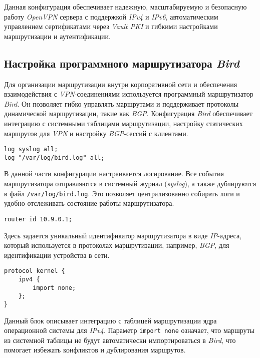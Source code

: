 Данная конфигурация обеспечивает надежную, масштабируемую и безопасную работу \textit{OpenVPN} сервера с поддержкой \textit{IPv4} и \textit{IPv6}, автоматическим управлением сертификатами через \textit{Vault PKI} и гибкими настройками маршрутизации и аутентификации.

\subsection[ Настройка программного маршрутизатора \textit{Bird}]{Настройка программного маршрутизатора \textit{Bird}}

Для организации маршрутизации внутри корпоративной сети и обеспечения взаимодействия с \textit{VPN}-соединениями используется программный маршрутизатор \textit{Bird}. Он позволяет гибко управлять маршрутами и поддерживает протоколы динамической маршрутизации, такие как \textit{BGP}. Конфигурация \textit{Bird} обеспечивает интеграцию с системными таблицами маршрутизации, настройку статических маршрутов для \textit{VPN} и настройку \textit{BGP}-сессий с клиентами.

\begin{lstlisting}
log syslog all;
log "/var/log/bird.log" all;
\end{lstlisting}

В данной части конфигурации настраивается логирование. Все события маршрутизатора отправляются в системный журнал (\textit{syslog}), а также дублируются в файл \lstinline{/var/log/bird.log}. Это позволяет централизованно собирать логи и удобно отслеживать состояние работы маршрутизатора.

\begin{lstlisting}
router id 10.9.0.1;
\end{lstlisting}

Здесь задается уникальный идентификатор маршрутизатора в виде \textit{IP}-адреса, который используется в протоколах маршрутизации, например, \textit{BGP}, для идентификации устройства в сети.

\begin{lstlisting}
protocol kernel {
    ipv4 {
        import none;
    };
}
\end{lstlisting}

Данный блок описывает интеграцию с таблицей маршрутизации ядра операционной системы для \textit{IPv4}. Параметр \lstinline{import none} означает, что маршруты из системной таблицы не будут автоматически импортироваться в \textit{Bird}, что помогает избежать конфликтов и дублирования маршрутов.

